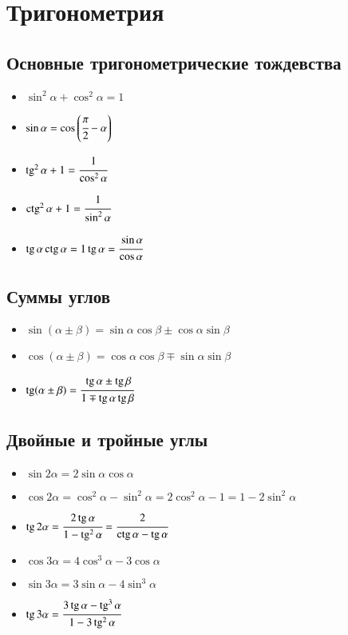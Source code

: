 \documentclass[twoside, a4paperpt, fleqn]{extarticle}
\begin{document}
    \section*{Тригонометрия}

    \subsection*{Основные тригонометрические тождевства}

    \begin{itemize}
        \item $\sin ^{2} \alpha+\cos ^{2} \alpha=1 $
        \item $\sin \alpha=\cos \left(\cfrac{\pi}{2}-\alpha\right) $
        \item $\operatorname{tg}^{2} \alpha+1=\cfrac{1}{\cos ^{2} \alpha} $
        \item $\operatorname{ctg}^{2} \alpha+1=\cfrac{1}{\sin ^{2} \alpha} $
        \item $\operatorname{tg} \alpha \operatorname{ctg} \alpha=1 \operatorname{tg} \alpha=\cfrac{\sin \alpha}{\cos \alpha}$
    \end{itemize}
    \subsection*{Суммы углов}
    \begin{itemize}
        \item $ \sin (\alpha \pm \beta)=\sin \alpha \cos \beta \pm \cos \alpha \sin \beta $
        \item $ \cos (\alpha \pm \beta)=\cos \alpha \cos \beta \mp \sin \alpha \sin \beta $
        \item $ \operatorname{tg}(\alpha \pm \beta)=\cfrac{\operatorname{tg} \alpha \pm \operatorname{tg} \beta}{1 \mp \operatorname{tg} \alpha \operatorname{tg} \beta}$
    \end{itemize}
    
    \subsection*{Двойные и тройные углы}

    \begin{itemize}
        \item $ \sin 2 \alpha=2 \sin \alpha \cos \alpha $
        \item $ \cos 2 \alpha=\cos ^{2} \alpha-\sin ^{2} \alpha= 2 \cos ^{2} \alpha-1=1-2 \sin ^{2} \alpha $
        \item $ \operatorname{tg} 2 \alpha=\cfrac{2 \operatorname{tg} \alpha}{1-\operatorname{tg}^{2} \alpha}=\cfrac{2}{\operatorname{ctg} \alpha-\operatorname{tg} \alpha} $
        \item $ \cos 3 \alpha=4 \cos ^{3} \alpha-3 \cos \alpha $
        \item $ \sin 3 \alpha=3 \sin \alpha-4 \sin ^{3} \alpha $
        \item $ \operatorname{tg} 3 \alpha=\cfrac{3 \operatorname{tg} \alpha-\operatorname{tg}^{3} \alpha}{1-3 \operatorname{tg}^{2} \alpha} $
    \end{itemize}
\end{document}
